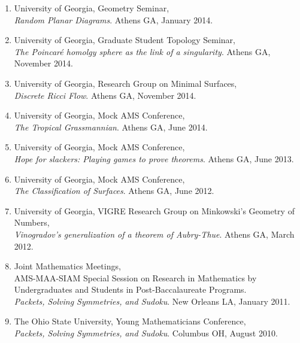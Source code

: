 \documentclass[letterpaper]{article}
\begin{document}
\begin{enumerate}
\item University of Georgia, Geometry Seminar,\\
  \textit{Random Planar Diagrams}. Athens GA, January 2014.
  
\item University of Georgia, Graduate Student Topology Seminar,\\
  \textit{The Poincar\'e homolgy sphere as the link of a singularity}. Athens GA, November 2014.
  
\item University of Georgia, Research Group on Minimal Surfaces, \\
  \textit{Discrete Ricci Flow}. Athens GA, November 2014.
  
\item University of Georgia, Mock AMS Conference, \\
  \textit{The Tropical Grassmannian}. Athens GA, June 2014.
  
\item University of Georgia, Mock AMS Conference, \\
  \textit{Hope for slackers: Playing games to prove theorems}. Athens GA, June 2013.
  
\item University of Georgia, Mock AMS Conference, \\
  \textit{The Classification of Surfaces}. Athens GA, June 2012.
  
\item University of Georgia, VIGRE Research Group on Minkowski's Geometry of Numbers, \\
  \textit{Vinogradov's generalization of a theorem of Aubry-Thue}. Athens GA, March 2012.
  
\item Joint Mathematics Meetings, \\
  AMS-MAA-SIAM Special Session on Research in Mathematics by
  Undergraduates and Students in Post-Baccalaureate Programs.\\
  \textit{Packets, Solving Symmetries, and Sudoku}. New Orleans LA, January 2011.
  
\item The Ohio State University, Young Mathematicians Conference, \\
  \textit{Packets, Solving Symmetries, and Sudoku}. Columbus OH, August 2010.
\end{enumerate}
\end{document}
